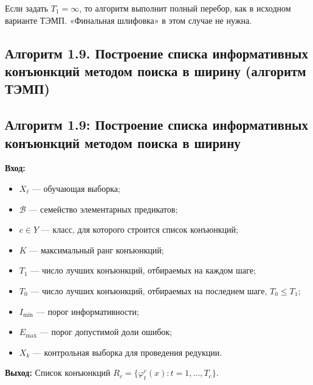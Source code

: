 Если задать $T_1 = \infty$, то алгоритм выполнит полный перебор, как в исходном варианте ТЭМП. «Финальная шлифовка» в этом случае не нужна.

\subsection{Алгоритм 1.9. Построение списка информативных конъюнкций методом поиска в ширину (алгоритм ТЭМП)}


\subsection{Алгоритм 1.9: Построение списка информативных конъюнкций методом поиска в ширину}

\textbf{Вход:}
\begin{itemize}
    \item $X_\ell$ --- обучающая выборка;
    \item $\mathcal{B}$ --- семейство элементарных предикатов;
    \item $c \in Y$ --- класс, для которого строится список конъюнкций;
    \item $K$ --- максимальный ранг конъюнкций;
    \item $T_1$ --- число лучших конъюнкций, отбираемых на каждом шаге;
    \item $T_0$ --- число лучших конъюнкций, отбираемых на последнем шаге, $T_0 \leq T_1$;
    \item $I_{\min}$ --- порог информативности;
    \item $E_{\max}$ --- порог допустимой доли ошибок;
    \item $X_k$ --- контрольная выборка для проведения редукции.
\end{itemize}

\textbf{Выход:} Список конъюнкций $R_c = \{\varphi_t^c(x) : t = 1, \dots, T_c\}$.

